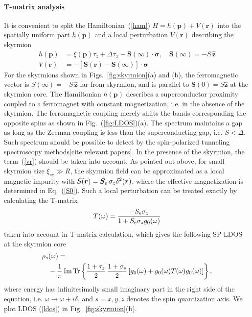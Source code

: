 \documentclass[twocolumn,showpacs,floatfix,nofootinbib,longbibliography]{revtex4-1}
\begin{document}
\paragraph*{T-matrix analysis} \label{sec:analytics}
It is convenient to split the Hamiltonian~(\ref{ham}) $H = h(\bm p)+V(\bm r)$ into the spatially uniform part $h(\bm p)$ and a local perturbation $V(\bm r)$ describing the skyrmion
\begin{align}
	h(\bm p) & =  \xi(\bm p)\tau_z+\Delta \tau_x - \bm S(\infty)\cdot\bm\sigma,\quad \bm S(\infty) = -S\,\hat{\bm z}\\
	V(\bm r) & =  - \left[\bm S(\bm r)-\bm S(\infty)\right]\cdot\bm\sigma  \label{vr}
\end{align}
For the skyrmions shown in Figs.~\ref{fig:skyrmion}(a) and (b), the ferromagnetic vector is $S(\infty) = -S\,\hat{\bm z}$ far from skyrmion, and is parallel to $\bm S(0)= S\hat{\bm z}$ at the skyrmion core. The Hamiltonian $h(\bm p)$ describes a superconductor proximity coupled to a ferromagnet with constant magnetization, i.e. in the absence of the skyrmion. The ferromagnetic coupling merely shifts the bands corresponding the opposite spins as shown in Fig.~(\ref{fig:LDOS})(a). The spectrum maintains a gap as long as the Zeeman coupling is less than the superconducting gap, i.e. $S<\Delta$. Such spectrum should be possible to detect by the spin-polarized tunneling spectroscopy methods[cite relevant papers]. In the presence of the skyrmion, the term~(\ref{vr}) should be taken into account. As pointed out above, for small skyrmion size $\xi_{sc}\gg R$, the skyrmion field can be approximated as a local magnetic impurity with $S(\bm r)=\bm S_{\rm e}\,\sigma_z \delta^2(\bm r)$, where the effective magnetization is determined in Eq.~(\ref{S0}). Such a local perturbation can be  treated exactly by calculating the T-matrix
\begin{align}
	T(\omega) =   \frac{-S_{\rm e}\sigma_z}{1+S_{\rm e}\sigma_zg_{0}(\omega)} \label{tm} 
\end{align}
taken into account in T-matrix calculation, which gives the following SP-LDOS at the skyrmion core
\begin{align}
	\rho_s & (\omega) = \label{ldos} \\ 
	&-\frac{1}{\pi}\,{\rm Im}{\rm \,Tr} \left\{  \frac{1+\tau_z}{2}\,\frac{1+\sigma_s}{2} \left[g_0(\omega)+g_0(\omega) T(\omega) g_0(\omega)  \right]\right\},\nonumber 
 \end{align}
 where energy has infinitesimally small imaginary part in the right side of the equation, i.e. $\omega\rightarrow \omega+i\delta$, and $s=x,y,z$ denotes the spin quantization axis. We plot LDOS (\ref{ldos}) in Fig.~\ref{fig:skyrmion}(b).   
\end{document}
